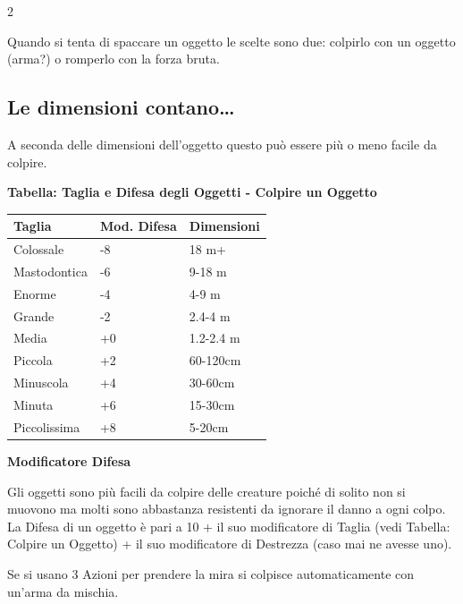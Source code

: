 \begin{multicols}{2}

\label{sfondare-ed-entrare}

Quando si tenta di spaccare un oggetto le scelte sono due: colpirlo con un oggetto (arma?) o romperlo con la forza bruta.

\smallskip

\subsection{Le dimensioni contano…}

A seconda delle dimensioni dell'oggetto questo può essere più o meno facile da colpire.

\medskip

\textbf{Tabella: Taglia e Difesa degli Oggetti - Colpire un Oggetto}

\medskip

\noindent\begin{tabularx}{\linewidth}{Xll}
	\toprule
\rowcolor{gray!20}\textbf{Taglia} & \textbf{Mod. Difesa} & \textbf{Dimensioni}\\
\toprule
Colossale & -8 &18 m+\\
\rowcolor{gray!20}Mastodontica & -6 &9-18 m\\
Enorme & -4 &4-9 m\\
\rowcolor{gray!20}Grande & -2 &2.4-4 m\\
Media & +0 &1.2-2.4 m\\
\rowcolor{gray!20}Piccola & +2 &60-120cm\\
Minuscola & +4 &30-60cm\\
\rowcolor{gray!20}Minuta & +6 &15-30cm\\
Piccolissima & +8 &5-20cm
\end{tabularx}

\medskip

\textbf{Modificatore Difesa}

Gli oggetti sono più facili da colpire delle creature poiché di solito non si muovono ma molti sono abbastanza resistenti da ignorare il danno a ogni colpo. La Difesa di un oggetto è pari a 10 + il suo modificatore di Taglia (vedi Tabella: Colpire un Oggetto) + il suo modificatore di Destrezza (caso mai ne avesse uno).

Se si usano 3 Azioni per prendere la mira si colpisce automaticamente con un'arma da mischia.


\end{multicols}
